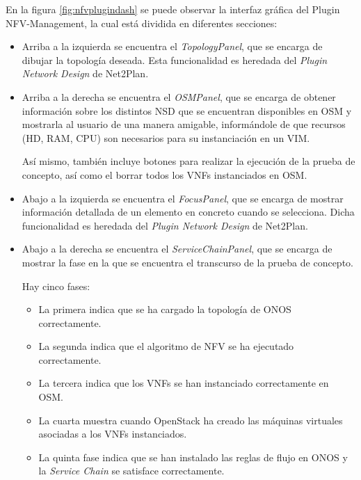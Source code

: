En la figura \ref{fig:nfvplugindash} se puede observar la interfaz gráfica del Plugin NFV-Management, la cual está dividida en diferentes secciones:

\begin{itemize}
	\item Arriba a la izquierda se encuentra el \textit{TopologyPanel}, que se encarga de dibujar la topología deseada. Esta funcionalidad es heredada del \textit{Plugin Network Design} de Net2Plan.
	
	\item Arriba a la derecha se encuentra el \textit{OSMPanel}, que se encarga de obtener información sobre los distintos NSD que se encuentran disponibles en OSM y mostrarla al usuario de una manera amigable, informándole de que recursos (\ac{HD}, \ac{RAM}, \ac{CPU}) son necesarios para su instanciación en un VIM.
	
	Así mismo, también incluye botones para realizar la ejecución de la prueba de concepto, así como el borrar todos los \acp{VNF} instanciados en \ac{OSM}.
	
	\item Abajo a la izquierda se encuentra el \textit{FocusPanel}, que se encarga de mostrar información detallada de un elemento en concreto cuando se selecciona. Dicha funcionalidad es heredada del \textit{Plugin Network Design} de Net2Plan.
	
	\item Abajo a la derecha se encuentra el \textit{ServiceChainPanel}, que se encarga de mostrar la fase en la que se encuentra el transcurso de la prueba de concepto. 
	
	Hay cinco fases: 
	
	\begin{itemize}
		
		\item La primera indica que se ha cargado la topología de \ac{ONOS} correctamente.
		
		\item La segunda indica que el algoritmo de \ac{NFV} se ha ejecutado correctamente.
		
		\item La tercera indica que los \acp{VNF} se han instanciado correctamente en \ac{OSM}.
		
		\item La cuarta muestra cuando OpenStack ha creado las máquinas virtuales asociadas a los \acp{VNF} instanciados.
		
		\item La quinta fase indica que se han instalado las reglas de flujo en \ac{ONOS} y la \textit{Service Chain} se satisface correctamente.
		
	\end{itemize}

\end{itemize}


\cleardoublepage